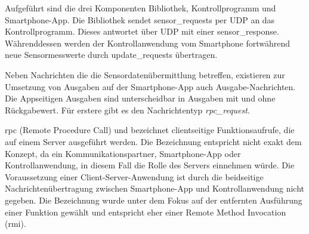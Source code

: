 \documentclass[11pt,a4paper]{report}
\begin{document}
Aufgeführt sind die drei Komponenten Bibliothek, Kontrollprogramm und Smartphone-App.
Die Bibliothek sendet sensor\_requests per UDP an das Kontrollprogramm.
Dieses antwortet über UDP mit einer sensor\_response.
Währenddessen werden der Kontrollanwendung vom Smartphone fortwährend neue Sensormesswerte durch update\_requests übertragen.

Neben Nachrichten die die Sensordatenübermittlung betreffen, existieren zur Umsetzung von Ausgaben auf der Smartphone-App auch Ausgabe-Nachrichten.
Die Appseitigen Ausgaben sind unterscheidbar in Ausgaben mit und ohne Rückgabewert.
Für erstere gibt es den Nachrichtentyp \textit{rpc\_request}.

\acrshort{rpc} (Remote Procedure Call) und bezeichnet clientseitige Funktionsaufrufe, die auf einem Server ausgeführt werden.
Die Bezeichnung entspricht nicht exakt dem Konzept, da ein Kommunikationspartner, Smartphone-App oder Kontrollanwendung, in diesem Fall die Rolle des Servers einnehmen würde.
Die Voraussetzung einer Client-Server-Anwendung ist durch die beidseitige Nachrichtenübertragung zwischen Smartphone-App und Kontrollanwendung nicht gegeben.
Die Bezeichnung wurde unter dem Fokus auf der entfernten Ausführung einer Funktion gewählt und entspricht eher einer Remote Method Invocation (\acrshort{rmi}).
\end{document}
